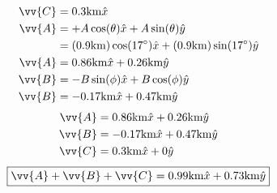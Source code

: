 \documentclass{article}
\begin{document}
\begin{align*}
    \vv{C} & = 0.3 \text{km} \hat{x} \\
    \vv{A} & = +A \cos(\theta) \hat{x} + A \sin(\theta) \hat{y} \\
           & = (0.9 \text{km}) \cos(17 \degree) \hat{x} + (0.9 \text{km}) \sin(17 \degree) \hat{y} \\
    \vv{A} & = 0.86 \text{km} \hat{x} + 0.26 \text{km} \hat{y} \\
    \vv{B} & = -B \sin(\phi) \hat{x} + B \cos(\phi) \hat{y} \\
    \vv{B} & = -0.17 \text{km} \hat{x} + 0.47 \text{km} \hat{y}
\end{align*}
\begin{align*}
    \vv{A} & = 0.86 \text{km} \hat{x} + 0.26 \text{km} \hat{y} \\
    \vv{B} & = -0.17 \text{km} \hat{x} + 0.47 \text{km} \hat{y} \\
    \vv{C} & = 0.3 \text{km} \hat{x} + 0 \hat{y}
\end{align*}
\begin{equation*}
    \boxed{\vv{A} + \vv{B} + \vv{C} = 0.99 \text{km} \hat{x} + 0.73 \text{km} \hat{y}}
\end{equation*}
\end{document}
